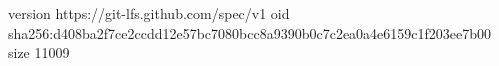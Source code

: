 version https://git-lfs.github.com/spec/v1
oid sha256:d408ba2f7ce2ccdd12e57bc7080bcc8a9390b0c7c2ea0a4e6159c1f203ee7b00
size 11009
